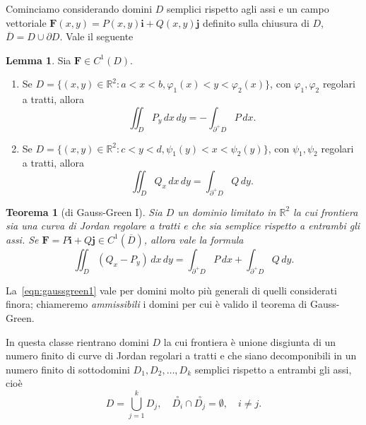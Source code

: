\documentclass[a4paper]{book}
\numberwithin{equation}{section}
\renewcommand{\phi}{\varphi}
\theoremstyle{plain}
\newtheorem{teor}{Teorema}[section]
\theoremstyle{definition}
\newtheorem{lem}{Lemma}[section]
\theoremstyle{remark}
\renewcommand{\vec}{\boldsymbol}
\theoremstyle{example}
\begin{document}
Cominciamo considerando domini $D$ semplici rispetto agli assi e un campo vettoriale $\vec{F}(x, y) = P(x, y) \vec{i} + Q(x, y)\vec{j}$ definito sulla chiusura di $D$, $\overline{D} = D \cup \partial D$. Vale il seguente
	\begin{lem}
		Sia $\vec{F} \in C^1(D)$.
			\begin{enumerate}
				\item Se $D = \{ (x, y) \in \mathbb{R}^2 \colon a < x < b, \phi_1(x) < y < \phi_2(x) \}$, con $\phi_1, \phi_2$ regolari a tratti, allora
					\begin{equation}
						\iint_D P_y \, dx \, dy = - \int_{\partial^+ D} P \, dx.
					\end{equation}

					\item Se $D = \{ (x, y) \in \mathbb{R}^2 \colon c < y < d, \psi_1(y) < x < \psi_2(y) \}$, con $\psi_1, \psi_2$ regolari a tratti, allora
						\begin{equation}
							\iint_D Q_x \, dx \, dy = \int_{\partial^+ D} Q \, dy.
						\end{equation}
			\end{enumerate}
	\end{lem}

\begin{teor}[di Gauss-Green I]
	\label{gaussgreen1}
	Sia $D$ un dominio limitato in $\mathbb{R}^2$ la cui frontiera sia una curva di Jordan regolare a tratti e che sia semplice rispetto a entrambi gli assi. Se $\vec{F} = P\vec{i} + Q\vec{j} \in C^1(\overline{D})$, allora vale la formula
		\begin{equation}
				\label{eqn:gaussgreen1}
			\iint_D (Q_x - P_y) \, dx \, dy  = \int_{\partial^+ D} P \, dx + \int_{\partial^+ D} Q \, dy.
		\end{equation}
\end{teor}

La~\eqref{eqn:gaussgreen1} vale per domini molto più generali di quelli considerati finora; chiameremo \emph{ammissibili} i domini per cui è valido il teorema di Gauss-Green.

In questa classe rientrano domini $D$ la cui frontiera è unione disgiunta di un numero finito di curve di Jordan regolari a tratti e che siano decomponibili in un numero finito di sottodomini $D_1, D_2, \dots, D_k$ semplici rispetto a entrambi gli assi, cioè
	\begin{equation*}
		D = \bigcup_{j=1}^k D_j, \quad \overset{\circ}{D_i} \cap \overset{\circ}{D_j} = \emptyset, \quad i \ne j.
	\end{equation*}
\end{document}
